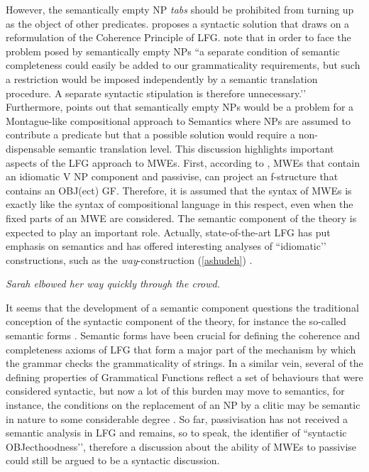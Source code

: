 \documentclass[output=paper]{langsci/langscibook}
\begin{document}
However, the semantically empty NP \textit{tabs} should be prohibited from turning up as the object of other predicates. \citet{Andrews:82} proposes a syntactic solution that draws on a reformulation of the Coherence Principle of LFG. \citet[67]{kaplan1995} note that in order to face the problem posed by semantically empty NPs ``a separate condition of semantic completeness could easily be added to our grammaticality requirements, but such a restriction would be imposed independently by a semantic translation procedure. A separate syntactic stipulation is therefore unnecessary.’' Furthermore, \citet[158]{Partee:04} points out that semantically empty NPs would be a problem for a  Montague-like compositional approach to Semantics where NPs are assumed to contribute a predicate but that a possible solution would require a non-dispensable semantic translation level.
This discussion highlights important aspects of the LFG approach to MWEs. First, according to \citet{Bresnan:82}, MWEs  that contain an idiomatic V NP component and passivise, can project an f-structure that contains an OBJ(ect) GF.  Therefore, it is assumed that the syntax of MWEs is exactly like the syntax of compositional language in this respect, even when the fixed parts of an MWE are considered. The semantic component of the theory is expected to play an important role. Actually, state-of-the-art LFG has put emphasis on semantics and has offered interesting analyses of ``idiomatic'’ constructions, such as the \textit{way}-construction (\ref{ashudeh}) \citep[30]{Asudeh:al:08}.  

\ea \label{ashudeh}
\textit{Sarah elbowed her way quickly through the crowd.}
\z

It seems that the development of a semantic component questions the traditional conception of the syntactic component of the theory, for instance the so-called semantic forms  \citep{Lowe:2015}. Semantic forms have been crucial for defining the coherence and completeness axioms of LFG that form a major part of the mechanism by which the grammar checks the grammaticality of strings.  In a similar vein, several of the defining properties of Grammatical Functions  reflect a set of behaviours that were considered syntactic, but now a lot of this burden may move to semantics, for instance,  the conditions on the replacement of an NP by a clitic may be semantic in nature  to some considerable degree \citep{Arnold:15}.  So far, passivisation has not received a semantic analysis in LFG and remains, so to speak, the identifier of ``syntactic OBJecthoodness'’, therefore a discussion about the ability of MWEs to passivise could still be argued to be a syntactic discussion.
\end{document}

